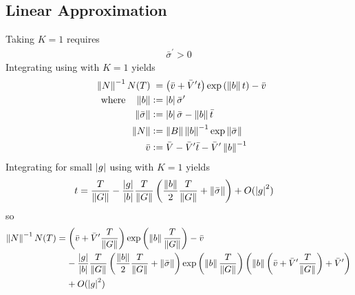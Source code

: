 \documentclass[a4paper]{base}
\begin{document}
\subsection{Linear Approximation}\label{sec:Lin}
    Taking $K=1$ requires
    \begin{equation} \label{sol:Quad:N}
        \begin{aligned}
           \bar{\sigma}^{\prime} > 0
        \end{aligned}
    \end{equation}
    Integrating  using  with $K=1$ yields
    \begin{equation} \label{sol:Lin:N}
        \begin{aligned}
            \norm{N}^{-1} N(T) &\phantom{:}= \left(\bar{v} + \bar{V}^{\prime}t\right) \exp \left(\norm{b} t\right) - \bar{v} \\
            \QT{where}\norm{b} &\deq \mds{b}\bar{\sigma}^{\prime} \\
            \norm{\bar{\sigma}} &\deq \mds{b}\bar{\sigma}-\norm{b} \bar{t} \\
            \norm{N} &\deq \norm{B} \norm{b}^{-1} \exp \norm{\bar{\sigma}} \\
            \bar{v} &\deq \bar{V} - \bar{V}^{\prime}\bar{t} - \bar{V}^{\prime} \norm{b}^{-1}
        \end{aligned}
    \end{equation}
    Integrating  for small $\left\lvert{g}\right\rvert$ using  with $K=1$ yields
    \begin{equation} \label{sol:Lin:t}
        \begin{aligned}
            t &= \frac{T}{\left\lVert{G}\right\rVert} - \frac{\left\lvert{g}\right\rvert}{\left\lvert{b}\right\rvert}\frac{T}{\left\lVert{G}\right\rVert} \left(\frac{\left\lVert{b}\right\rVert}{2}\frac{T}{\left\lVert{G}\right\rVert} + \left\lVert{\bar{\sigma}}\right\rVert\right) 
                + O(\left\lvert{g}\right\rvert^{2})
        \end{aligned}
    \end{equation}
    so
    \begin{equation} \label{sol:Lin:CSD}
        \begin{aligned}
            \left\lVert{N}\right\rVert^{-1} N(T) &= \left(\bar{v} + \bar{V}^{\prime}\frac{T}{\left\lVert{G}\right\rVert}\right) \exp \left(\left\lVert{b}\right\rVert \frac{T}{\left\lVert{G}\right\rVert}\right) - \bar{v} \\
            &\phantom{=\ }-\frac{\left\lvert{g}\right\rvert}{\left\lvert{b}\right\rvert}\frac{T}{\left\lVert{G}\right\rVert} \left(\frac{\left\lVert{b}\right\rVert}{2}\frac{T}{\left\lVert{G}\right\rVert} + \left\lVert{\bar{\sigma}}\right\rVert\right)
                 \exp \left(\left\lVert{b}\right\rVert \frac{T}{\left\lVert{G}\right\rVert}\right)
                 \left(\left\lVert{b}\right\rVert\left(\bar{v} + \bar{V}^{\prime}\frac{T}{\left\lVert{G}\right\rVert}\right) + \bar{V}^{\prime}\right) \\
            &\phantom{=\ }+ O(\left\lvert{g}\right\rvert^{2})
        \end{aligned}
    \end{equation}
\end{document}
